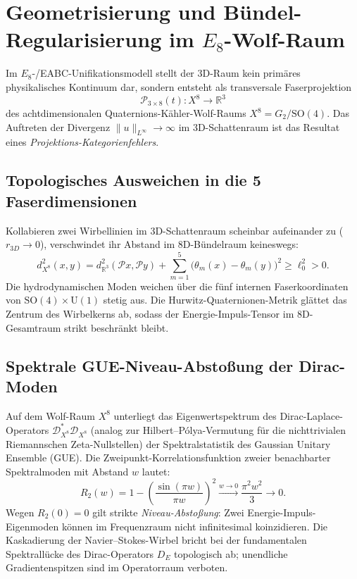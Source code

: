 \documentclass[11pt,a4paper]{article}
\theoremstyle{remark}
\begin{document}
\section{Geometrisierung und Bündel-Regularisierung im $E_8$-Wolf-Raum}

Im $E_8$-/EABC-Unifikationsmodell stellt der 3D-Raum kein primäres physikalisches Kontinuum dar, sondern entsteht als transversale Faserprojektion
\begin{equation}
\mathcal{P}_{3 \times 8}(t): X^8 \longrightarrow \mathbb{R}^3
\end{equation}
des achtdimensionalen Quaternions-Kähler-Wolf-Raums $X^8 = G_2/\mathrm{SO}(4)$. Das Auftreten der Divergenz $\|u\|_{L^\infty} \to \infty$ im 3D-Schattenraum ist das Resultat eines \emph{Projektions-Kategorienfehlers}.

\subsection{Topologisches Ausweichen in die 5 Faserdimensionen}
Kollabieren zwei Wirbellinien im 3D-Schattenraum scheinbar aufeinander zu ($r_{3D} \to 0$), verschwindet ihr Abstand im 8D-Bündelraum keineswegs:
\begin{equation}
d_{X^8}^2(x, y) = d_{\mathbb{R}^3}^2(\mathcal{P}x, \mathcal{P}y) + \sum_{m=1}^5 \big( \theta_m(x) - \theta_m(y) \big)^2 \ge \ell_0^2 > 0.
\end{equation}
Die hydrodynamischen Moden weichen über die fünf internen Faserkoordinaten von $\mathrm{SO}(4) \times \mathrm{U}(1)$ stetig aus. Die Hurwitz-Quaternionen-Metrik glättet das Zentrum des Wirbelkerns ab, sodass der Energie-Impuls-Tensor im 8D-Gesamtraum strikt beschränkt bleibt.

\subsection{Spektrale GUE-Niveau-Abstoßung der Dirac-Moden}
Auf dem Wolf-Raum $X^8$ unterliegt das Eigenwertspektrum des Dirac-Laplace-Operators $\mathcal{D}_{X^8}^* \mathcal{D}_{X^8}$ (analog zur Hilbert--Pólya-Vermutung für die nichttrivialen Riemannschen Zeta-Nullstellen) der Spektralstatistik des Gaussian Unitary Ensemble (GUE). 
Die Zweipunkt-Korrelationsfunktion zweier benachbarter Spektralmoden mit Abstand $w$ lautet:
\begin{equation}
R_2(w) = 1 - \left( \frac{\sin(\pi w)}{\pi w} \right)^2 \xrightarrow{w \to 0} \frac{\pi^2 w^2}{3} \longrightarrow 0.
\end{equation}
Wegen $R_2(0) = 0$ gilt strikte \emph{Niveau-Abstoßung}: Zwei Energie-Impuls-Eigenmoden können im Frequenzraum nicht infinitesimal koinzidieren. Die Kaskadierung der Navier--Stokes-Wirbel bricht bei der fundamentalen Spektrallücke des Dirac-Operators $D_E$ topologisch ab; unendliche Gradientenspitzen sind im Operatorraum verboten.
\end{document}
